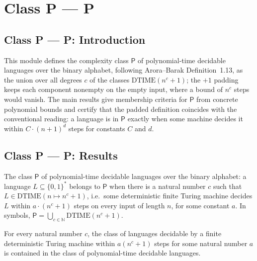 \section{Class P --- P}
\subsection*{Class P --- P: Introduction}

This module defines the complexity class $\mathsf{P}$ of polynomial-time
decidable languages over the binary alphabet, following Arora--Barak
Definition~1.13, as the union over all degrees $c$ of the classes
$\mathrm{DTIME}(n^c + 1)$; the $+1$ padding keeps each component nonempty on the
empty input, where a bound of $n^c$ steps would vanish. The main results give
membership criteria for $\mathsf{P}$ from concrete polynomial bounds and certify
that the padded definition coincides with the conventional reading: a language
is in $\mathsf{P}$ exactly when some machine decides it within $C \cdot (n+1)^d$
steps for constants $C$ and $d$.

\subsection*{Class P --- P: Results}

\begin{definition}
\label{Complexity.P}
\leanok
{}
The class $\mathsf{P}$ of polynomial-time decidable languages over the binary
alphabet: a language $L \subseteq \{0,1\}^{*}$ belongs to $\mathsf{P}$ when
there is a natural number $c$ such that $L \in \mathrm{DTIME}(n \mapsto n^c + 1)$,
i.e.\ some deterministic finite Turing machine decides $L$ within
$a \cdot (n^c + 1)$ steps on every input of length $n$, for some constant $a$.
In symbols, $\mathsf{P} = \bigcup_{c \in \mathbb{N}} \mathrm{DTIME}(n^c + 1)$.
\end{definition}

\begin{theorem}
\label{Complexity.dtime_poly_subset_P}
\leanok
{}
For every natural number $c$, the class of languages decidable by a finite deterministic
Turing machine within $a(n^c+1)$ steps for some natural number $a$ is contained in the
class of polynomial-time decidable languages.
\end{theorem}

